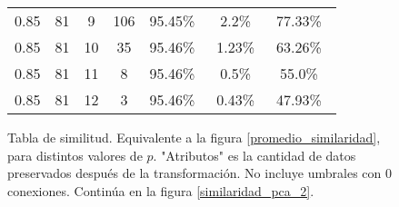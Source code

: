 \begin{figure}[!htbp]
{\begin{tabular}{ |c|c|c|c|c|c|c| }
        0.85             &81             &9            &106                 & 95.45\%\     & 2.2\%\               & 77.33\%\ \\
        0.85             &81             &10            &35                 & 95.46\%\     & 1.23\%\               & 63.26\%\ \\
        0.85             &81             &11            &8                 & 95.46\%\     & 0.5\%\               & 55.0\%\ \\
        0.85             &81             &12            &3                 & 95.46\%\     & 0.43\%\               & 47.93\%\ \\
        \hline
        \end{tabular}
    }
    \bigskip
    \caption{Tabla de similitud. Equivalente a la figura \ref{promedio_similaridad}, para distintos valores de $p$. "Atributos" es la cantidad de datos preservados después de la transformación. No incluye umbrales con 0 conexiones. Continúa en la figura \ref{similaridad_pca_2}.} \label{similaridad_pca}
\end{figure}



